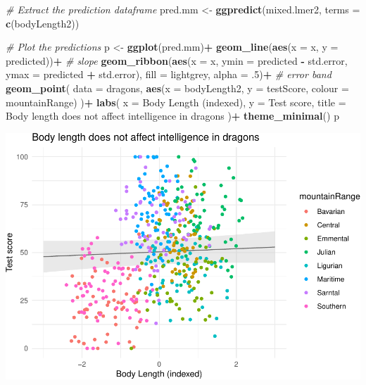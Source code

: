 \documentclass[
]{article}
\newenvironment{Shaded}{\begin{snugshade}}{\end{snugshade}}
\newcommand{\AttributeTok}[1]{\textcolor[rgb]{0.13,0.29,0.53}{#1}}
\newcommand{\CommentTok}[1]{\textcolor[rgb]{0.56,0.35,0.01}{\textit{#1}}}
\newcommand{\DecValTok}[1]{\textcolor[rgb]{0.00,0.00,0.81}{#1}}
\newcommand{\FunctionTok}[1]{\textcolor[rgb]{0.13,0.29,0.53}{\textbf{#1}}}
\newcommand{\NormalTok}[1]{#1}
\newcommand{\OtherTok}[1]{\textcolor[rgb]{0.56,0.35,0.01}{#1}}
\newcommand{\SpecialCharTok}[1]{\textcolor[rgb]{0.81,0.36,0.00}{\textbf{#1}}}
\newcommand{\StringTok}[1]{\textcolor[rgb]{0.31,0.60,0.02}{#1}}
\begin{document}
\begin{Shaded}
\begin{Highlighting}[]
\CommentTok{\# Extract the prediction dataframe}
\NormalTok{pred.mm }\OtherTok{\textless{}{-}} \FunctionTok{ggpredict}\NormalTok{(mixed.lmer2, }\AttributeTok{terms =} \FunctionTok{c}\NormalTok{(}\StringTok{\textquotesingle{}bodyLength2\textquotesingle{}}\NormalTok{))}

\CommentTok{\# Plot the predictions}
\NormalTok{p }\OtherTok{\textless{}{-}} \FunctionTok{ggplot}\NormalTok{(pred.mm)}\SpecialCharTok{+}
  \FunctionTok{geom\_line}\NormalTok{(}\FunctionTok{aes}\NormalTok{(}\AttributeTok{x =}\NormalTok{ x, }\AttributeTok{y =}\NormalTok{ predicted))}\SpecialCharTok{+}   \CommentTok{\# slope}
  \FunctionTok{geom\_ribbon}\NormalTok{(}\FunctionTok{aes}\NormalTok{(}\AttributeTok{x =}\NormalTok{ x, }\AttributeTok{ymin =}\NormalTok{ predicted }\SpecialCharTok{{-}}\NormalTok{ std.error, }\AttributeTok{ymax =}\NormalTok{ predicted }\SpecialCharTok{+}\NormalTok{ std.error),}
              \AttributeTok{fill =} \StringTok{\textquotesingle{}lightgrey\textquotesingle{}}\NormalTok{, }\AttributeTok{alpha =}\NormalTok{ .}\DecValTok{5}\NormalTok{)}\SpecialCharTok{+}   \CommentTok{\# error band}
  \FunctionTok{geom\_point}\NormalTok{(}
    \AttributeTok{data =}\NormalTok{ dragons,}
    \FunctionTok{aes}\NormalTok{(}\AttributeTok{x =}\NormalTok{ bodyLength2, }\AttributeTok{y =}\NormalTok{ testScore, }\AttributeTok{colour =}\NormalTok{ mountainRange)}
\NormalTok{  )}\SpecialCharTok{+}
  \FunctionTok{labs}\NormalTok{(}
    \AttributeTok{x =} \StringTok{\textquotesingle{}Body Length (indexed)\textquotesingle{}}\NormalTok{, }\AttributeTok{y =} \StringTok{\textquotesingle{}Test score\textquotesingle{}}\NormalTok{,}
    \AttributeTok{title =} \StringTok{\textquotesingle{}Body length does not affect intelligence in dragons\textquotesingle{}}
\NormalTok{  )}\SpecialCharTok{+}
  \FunctionTok{theme\_minimal}\NormalTok{()}
\NormalTok{p}
\end{Highlighting}
\end{Shaded}

\includegraphics{Introduction-to-linear-mixed-models_files/figure-latex/unnamed-chunk-24-1.pdf}
\end{document}
